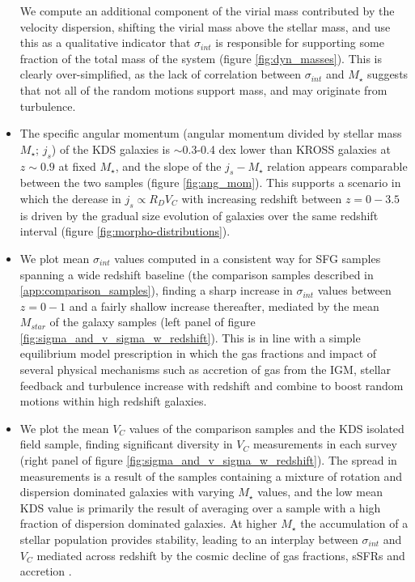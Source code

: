 \documentclass[fleqn,usenatbib]{mn2e}
\begin{document}
\begin{itemize}
    We compute an additional component of the virial mass contributed by the velocity dispersion, shifting the virial mass above the stellar mass, and use this as a qualitative indicator that $\sigma_{int}$ is responsible for supporting some fraction of the total mass of the system (figure \ref{fig:dyn_masses}).
    This is clearly over-simplified, as the lack of correlation between $\sigma_{int}$ and $M_{\star}$ suggests that not all of the random motions support mass, and may originate from turbulence.
    \item The specific angular momentum (angular momentum divided by stellar mass $M_{\star}$; $j_{s}$) of the KDS galaxies is $\sim$0.3-0.4 dex lower than KROSS galaxies at $z\sim0.9$ at fixed $M_{\star}$, and the slope of the $j_{s}-M_{\star}$ relation appears comparable between the two samples (figure \ref{fig:ang_mom}).
    This supports a scenario in which the derease in $j_{s} \propto R_{D}V_{C}$ with increasing redshift between $z=0-3.5$ is driven by the gradual size evolution of galaxies over the same redshift interval (figure \ref{fig:morpho-distributions}).
    \item We plot mean $\sigma_{int}$ values computed in a consistent way for SFG samples spanning a wide redshift baseline (the comparison samples described in \cref{app:comparison_samples}), finding a sharp increase in $\sigma_{int}$ values between $z=0-1$ and a fairly shallow increase thereafter, mediated by the mean $M_{star}$ of the galaxy samples (left panel of figure \ref{fig:sigma_and_v_sigma_w_redshift}).
    This is in line with a simple equilibrium model prescription in which the gas fractions and impact of several physical mechanisms such as accretion of gas from the IGM, stellar feedback and turbulence increase with redshift and combine to boost random motions within high redshift galaxies.
    \item We plot the mean $V_{C}$ values of the comparison samples and the KDS isolated field sample, finding significant diversity in $V_{C}$ measurements in each survey (right panel of figure \ref{fig:sigma_and_v_sigma_w_redshift}).
    The spread in measurements is a result of the samples containing a mixture of rotation and dispersion dominated galaxies with varying $M_{\star}$ values, and the low mean KDS value is primarily the result of averaging over a sample with a high fraction of dispersion dominated galaxies.
    At higher $M_{\star}$ the accumulation of a stellar population provides stability, leading to an interplay between $\sigma_{int}$ and $V_{C}$ mediated across redshift by the cosmic decline of gas fractions, sSFRs and accretion \citep[e.g.][]{Wisnioski2015}. 

\end{itemize}
\end{document}
